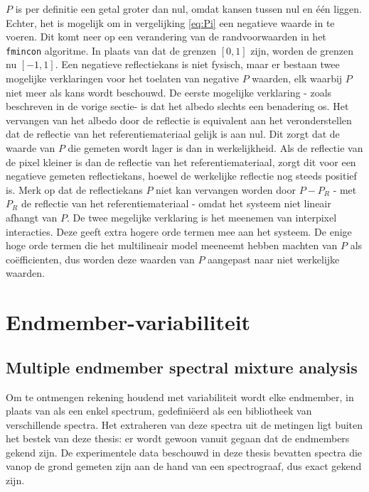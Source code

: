 \documentclass[12pt]{report}
\begin{document}
$P$ is per definitie een getal groter dan nul, omdat kansen tussen nul en \'e\'en liggen. Echter, het is mogelijk om in vergelijking \ref{eq:Pi} een negatieve waarde in te voeren. Dit komt neer op een verandering van de randvoorwaarden in het \texttt{fmincon} algoritme. In plaats van dat de grenzen $[0,1]$ zijn, worden de grenzen nu $[-1,1]$. 
Een negatieve reflectiekans is niet fysisch, maar er bestaan twee mogelijke verklaringen voor het toelaten van negative $P$ waarden, elk waarbij $P$ niet meer als kans wordt beschouwd.
De eerste mogelijke verklaring - zoals beschreven in de vorige sectie- is dat het albedo slechts een benadering os. Het vervangen van het albedo door de reflectie is equivalent aan het veronderstellen dat de reflectie van het referentiemateriaal gelijk is aan nul. Dit zorgt dat de waarde van $P$ die gemeten wordt lager is dan in werkelijkheid. Als de reflectie van de pixel kleiner is dan de reflectie van het referentiemateriaal, zorgt dit voor een negatieve gemeten reflectiekans, hoewel de werkelijke reflectie nog steeds positief is. Merk op dat de reflectiekans $P$ niet kan  vervangen worden door $P-P_{R}$ - met $P_{R}$ de reflectie van het referentiemateriaal - omdat het systeem niet lineair afhangt van $P$.
De twee megelijke verklaring is het meenemen van interpixel interacties. Deze geeft extra hogere orde termen mee aan het systeem. De enige hoge orde termen die het multilineair model meeneemt hebben machten van $P$ als co\"efficienten, dus worden deze waarden van $P$ aangepast naar niet werkelijke waarden.  



\chapter{Endmember-variabiliteit} 

\section{Multiple endmember spectral mixture analysis\cite{mesma}} \label{sec:mesma}

Om te ontmengen rekening houdend met variabiliteit wordt elke endmember, in plaats van als een enkel spectrum, gedefini\"eerd als een bibliotheek van verschillende spectra. Het extraheren van deze spectra uit de metingen ligt buiten het bestek van deze thesis: er wordt gewoon vanuit gegaan dat de endmembers gekend zijn. De experimentele data beschouwd in deze thesis bevatten spectra die vanop de grond gemeten zijn aan de hand van een spectrograaf, dus exact gekend zijn.
\end{document}
